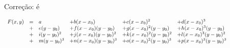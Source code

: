 \documentclass[oneside,12pt]{article}
\begin{document}
\newpage

\def\x   {(x-x_0)}
\def\xx  {(x-x_0)^2}
\def\xxx {(x-x_0)^3}
\def\xxxx{(x-x_0)^4}
\def\y   {(y-y_0)}
\def\yy  {(y-y_0)^2}
\def\yyy {(y-y_0)^3}
\def\yyyy{(y-y_0)^4}

Correção: é

$\scalebox{0.75}{$
 \begin{array}{rcllllllll}
 F(x,y)&=& a      &+ b \x      &+ c \xx      &+ d \xxx      \\
       &+& e \y   &+ f \x \y   &+ g \xx \y   &+ h \xxx \y   \\
       &+& i \yy  &+ j \x \yy  &+ k \xx \yy  &+ l \xxx \yy  \\
       &+& m \yyy &+ n \x \yyy &+ o \xx \yyy &+ p \xxx \yyy \\
 \end{array}
 $}
$
\end{document}

